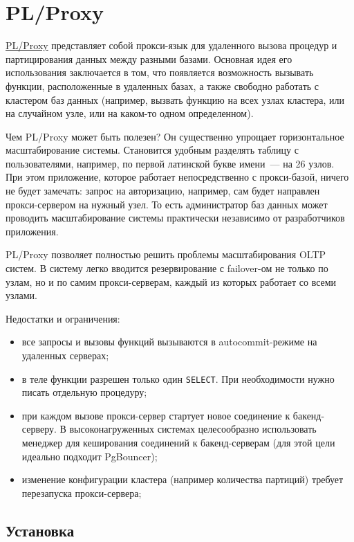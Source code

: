 \section{PL/Proxy}
\label{sec:plproxy}

\href{https://plproxy.github.io/}{PL/Proxy} представляет собой прокси-язык для удаленного вызова процедур и партицирования данных между разными базами. Основная идея его использования заключается в том, что появляется возможность вызывать функции, расположенные в удаленных базах, а также свободно работать с кластером баз данных (например, вызвать функцию на всех узлах кластера, или на случайном узле, или на каком-то одном определенном).

Чем PL/Proxy может быть полезен? Он существенно упрощает горизонтальное масштабирование системы. Становится удобным разделять таблицу с пользователями, например, по первой латинской букве имени~--- на 26 узлов. При этом приложение, которое работает непосредственно с прокси-базой, ничего не будет замечать: запрос на авторизацию, например, сам будет направлен прокси-сервером на нужный узел. То есть администратор баз данных может проводить масштабирование системы практически независимо от разработчиков приложения.

PL/Proxy позволяет полностью решить проблемы масштабирования OLTP систем. В систему легко вводится резервирование с failover-ом не только по узлам, но и по самим прокси-серверам, каждый из которых работает со всеми узлами.

Недостатки и ограничения:

\begin{itemize}
  \item все запросы и вызовы функций вызываются в autocommit-режиме на удаленных серверах;
  \item в теле функции разрешен только один \lstinline!SELECT!. При необходимости нужно писать отдельную процедуру;
  \item при каждом вызове прокси-сервер стартует новое соединение к бакенд-серверу. В высоконагруженных системах целесообразно использовать менеджер для кеширования соединений к бакенд-серверам (для этой цели идеально подходит PgBouncer);
  \item изменение конфигурации кластера (например количества партиций) требует перезапуска прокси-сервера;
\end{itemize}


\subsection{Установка}


